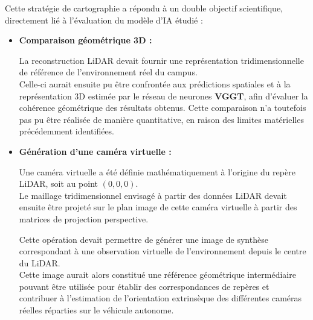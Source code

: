 \documentclass[12pt,a4paper,oneside]{report}
\begin{document}
\hspace*{1cm}Cette stratégie de cartographie a répondu à un double objectif scientifique, directement lié à l'évaluation du modèle d'IA étudié :\vspace{0.05cm}

\begin{itemize}[label=\textbullet, itemsep=0.5em]

\item \textbf{Comparaison géométrique 3D :}\vspace{0.05cm}

\hspace*{1cm}La reconstruction LiDAR devait fournir une représentation tridimensionnelle de référence de l'environnement réel du campus. \\
\hspace*{1cm}Celle-ci aurait ensuite pu être confrontée aux prédictions spatiales et à la représentation 3D estimée par le réseau de neurones \textbf{VGGT}, afin d'évaluer la cohérence géométrique des résultats obtenus. Cette comparaison n'a toutefois pas pu être réalisée de manière quantitative, en raison des limites matérielles précédemment identifiées.

\item \textbf{Génération d'une caméra virtuelle :}\vspace{0.05cm}

\hspace*{1cm}Une caméra virtuelle a été définie mathématiquement à l'origine du repère LiDAR, soit au point $(0,0,0)$.\\
\hspace*{0.5cm}Le maillage tridimensionnel envisagé à partir des données LiDAR devait ensuite être projeté sur le plan image de cette caméra virtuelle à partir des matrices de projection perspective.\vspace{0.05cm}

\hspace*{1cm}Cette opération devait permettre de générer une image de synthèse correspondant à une observation virtuelle de l'environnement depuis le centre du LiDAR.\\
\hspace*{0.5cm}Cette image aurait alors constitué une référence géométrique intermédiaire pouvant être utilisée pour établir des correspondances de repères et contribuer à l'estimation de l'orientation extrinsèque des différentes caméras réelles réparties sur le véhicule autonome.

\end{itemize}
\end{document}
